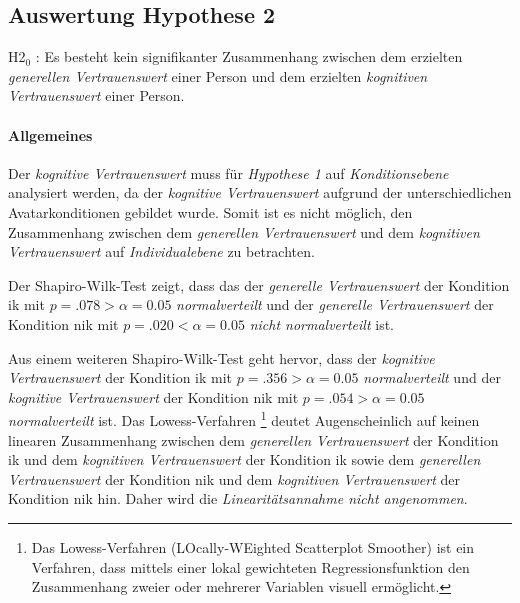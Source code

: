 \documentclass[a4paper,11pt]{article}%
\renewcommand{\\}{\vspace*{0.5\baselineskip} \newline}
\begin{document}
\newpage
\subsection{Auswertung Hypothese 2}
H2$_{0}$ : Es besteht kein signifikanter Zusammenhang zwischen dem erzielten \textit{generellen Vertrauenswert} einer Person und dem erzielten \textit{kognitiven Vertrauenswert} einer Person.

\paragraph{Allgemeines}
Der \textit{kognitive Vertrauenswert} muss für \textit{Hypothese 1} auf \textit{Konditionsebene} analysiert werden, da der \textit{kognitive Vertrauenswert} aufgrund der unterschiedlichen Avatarkonditionen gebildet wurde. Somit ist es nicht möglich, den Zusammenhang zwischen dem \textit{generellen Vertrauenswert} und dem \textit{kognitiven Vertrauenswert} auf \textit{Individualebene} zu betrachten.

Der Shapiro-Wilk-Test zeigt, dass das der \textit{generelle Vertrauenswert} der Kondition \ac{ik} mit  $p = .078 > \alpha = 0.05$ \textit{normalverteilt} und der \textit{generelle Vertrauenswert} der Kondition \ac{nik} mit $p = .020 < \alpha = 0.05$ \textit{nicht normalverteilt} ist.

Aus einem weiteren Shapiro-Wilk-Test geht hervor, dass der \textit{kognitive Vertrauenswert} der Kondition \ac{ik} mit  $p = .356 > \alpha = 0.05$ \textit{normalverteilt} und der \textit{kognitive Vertrauenswert} der Kondition \ac{nik} mit $p = .054 > \alpha = 0.05$ \textit{normalverteilt} ist.
Das Lowess-Verfahren \footnote{Das Lowess-Verfahren (LOcally-WEighted Scatterplot Smoother) ist ein Verfahren, dass mittels einer lokal gewichteten Regressionsfunktion den Zusammenhang zweier oder mehrerer Variablen visuell ermöglicht.} deutet Augenscheinlich auf keinen linearen Zusammenhang zwischen dem \textit{generellen Vertrauenswert} der Kondition \ac{ik} und dem \textit{kognitiven Vertrauenswert} der Kondition \ac{ik} sowie dem \textit{generellen Vertrauenswert} der Kondition \ac{nik} und dem \textit{kognitiven Vertrauenswert} der Kondition \ac{nik} hin. Daher wird die \textit{Linearitätsannahme nicht angenommen}.
\end{document}
